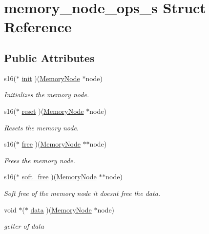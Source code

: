 \hypertarget{structmemory__node__ops__s}{}\section{memory\+\_\+node\+\_\+ops\+\_\+s Struct Reference}
\label{structmemory__node__ops__s}
\subsection*{Public Attributes}
\begin{DoxyCompactItemize}
\item 
s16($\ast$ \hyperlink{structmemory__node__ops__s_a9b50f77455ae67d99ce92e9fde94ae93}{init} )(\hyperlink{structmemory__node__s}{Memory\+Node} $\ast$node)
\begin{DoxyCompactList}\small\item\em Initializes the memory node. \end{DoxyCompactList}\item 
s16($\ast$ \hyperlink{structmemory__node__ops__s_a8a9d4846b4b5628d9994467f6f492b81}{reset} )(\hyperlink{structmemory__node__s}{Memory\+Node} $\ast$node)
\begin{DoxyCompactList}\small\item\em Resets the memory node. \end{DoxyCompactList}\item 
s16($\ast$ \hyperlink{structmemory__node__ops__s_a80866224e48d132a253baccc3543dda3}{free} )(\hyperlink{structmemory__node__s}{Memory\+Node} $\ast$$\ast$node)
\begin{DoxyCompactList}\small\item\em Frees the memory node. \end{DoxyCompactList}\item 
s16($\ast$ \hyperlink{structmemory__node__ops__s_a51993e6d5aeb1025181ba5ae46e9f0a8}{soft\+\_\+free} )(\hyperlink{structmemory__node__s}{Memory\+Node} $\ast$$\ast$node)
\begin{DoxyCompactList}\small\item\em Soft free of the memory node it doesn\textquotesingle{}t free the data. \end{DoxyCompactList}\item 
void $\ast$($\ast$ \hyperlink{structmemory__node__ops__s_a35f5ace76d5fd899597761eef516ba0a}{data} )(\hyperlink{structmemory__node__s}{Memory\+Node} $\ast$node)
\begin{DoxyCompactList}\small\item\em getter of data \end{DoxyCompactList}\item 

\end{DoxyCompactItemize}
